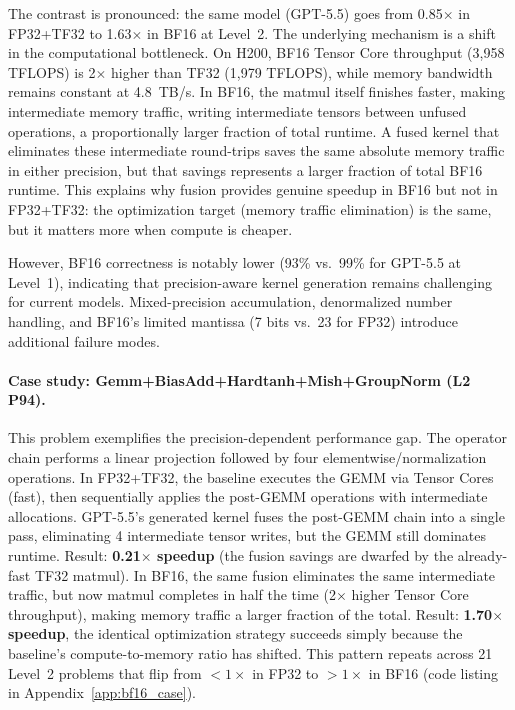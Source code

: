 \documentclass[]{fairmeta}
\begin{document}
The contrast is pronounced: the same model (GPT-5.5) goes from 0.85$\times$ in FP32+TF32 to 1.63$\times$ in BF16 at Level~2. The underlying mechanism is a shift in the computational bottleneck. On H200, BF16 Tensor Core throughput (3,958 TFLOPS) is 2$\times$ higher than TF32 (1,979 TFLOPS), while memory bandwidth remains constant at 4.8~TB/s. In BF16, the matmul itself finishes faster, making intermediate memory traffic, writing intermediate tensors between unfused operations, a proportionally larger fraction of total runtime. A fused kernel that eliminates these intermediate round-trips saves the same absolute memory traffic in either precision, but that savings represents a larger fraction of total BF16 runtime. This explains why fusion provides genuine speedup in BF16 but not in FP32+TF32: the optimization target (memory traffic elimination) is the same, but it matters more when compute is cheaper.

However, BF16 correctness is notably lower (93\% vs.\ 99\% for GPT-5.5 at Level~1), indicating that precision-aware kernel generation remains challenging for current models. Mixed-precision accumulation, denormalized number handling, and BF16's limited mantissa (7 bits vs.\ 23 for FP32) introduce additional failure modes.

\paragraph{Case study: Gemm+BiasAdd+Hardtanh+Mish+GroupNorm (L2 P94).}
This problem exemplifies the precision-dependent performance gap. The operator chain performs a linear projection followed by four elementwise/normalization operations. In FP32+TF32, the baseline executes the GEMM via Tensor Cores (fast), then sequentially applies the post-GEMM operations with intermediate allocations. GPT-5.5's generated kernel fuses the post-GEMM chain into a single pass, eliminating 4 intermediate tensor writes, but the GEMM still dominates runtime. Result: \textbf{0.21$\times$ speedup} (the fusion savings are dwarfed by the already-fast TF32 matmul). In BF16, the same fusion eliminates the same intermediate traffic, but now matmul completes in half the time (2$\times$ higher Tensor Core throughput), making memory traffic a larger fraction of the total. Result: \textbf{1.70$\times$ speedup}, the identical optimization strategy succeeds simply because the baseline's compute-to-memory ratio has shifted. This pattern repeats across 21 Level~2 problems that flip from $<1\times$ in FP32 to $>1\times$ in BF16 (code listing in Appendix~\ref{app:bf16_case}).
\end{document}
